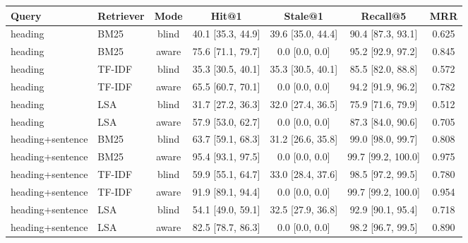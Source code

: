 \begin{tabular}{llccccc}
\toprule
Query & Retriever & Mode & Hit@1 & Stale@1 & Recall@5 & MRR \\
\midrule
heading & BM25 & blind & 40.1 [35.3, 44.9] & 39.6 [35.0, 44.4] & 90.4 [87.3, 93.1] & 0.625 \\
heading & BM25 & aware & 75.6 [71.1, 79.7] & 0.0 [0.0, 0.0] & 95.2 [92.9, 97.2] & 0.845 \\
heading & TF-IDF & blind & 35.3 [30.5, 40.1] & 35.3 [30.5, 40.1] & 85.5 [82.0, 88.8] & 0.572 \\
heading & TF-IDF & aware & 65.5 [60.7, 70.1] & 0.0 [0.0, 0.0] & 94.2 [91.9, 96.2] & 0.782 \\
heading & LSA & blind & 31.7 [27.2, 36.3] & 32.0 [27.4, 36.5] & 75.9 [71.6, 79.9] & 0.512 \\
heading & LSA & aware & 57.9 [53.0, 62.7] & 0.0 [0.0, 0.0] & 87.3 [84.0, 90.6] & 0.705 \\
\midrule
heading+sentence & BM25 & blind & 63.7 [59.1, 68.3] & 31.2 [26.6, 35.8] & 99.0 [98.0, 99.7] & 0.808 \\
heading+sentence & BM25 & aware & 95.4 [93.1, 97.5] & 0.0 [0.0, 0.0] & 99.7 [99.2, 100.0] & 0.975 \\
heading+sentence & TF-IDF & blind & 59.9 [55.1, 64.7] & 33.0 [28.4, 37.6] & 98.5 [97.2, 99.5] & 0.780 \\
heading+sentence & TF-IDF & aware & 91.9 [89.1, 94.4] & 0.0 [0.0, 0.0] & 99.7 [99.2, 100.0] & 0.954 \\
heading+sentence & LSA & blind & 54.1 [49.0, 59.1] & 32.5 [27.9, 36.8] & 92.9 [90.1, 95.4] & 0.718 \\
heading+sentence & LSA & aware & 82.5 [78.7, 86.3] & 0.0 [0.0, 0.0] & 98.2 [96.7, 99.5] & 0.890 \\
\bottomrule
\end{tabular}
